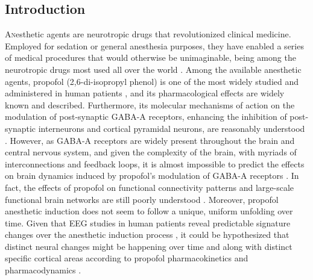 \documentclass[twoside]{article}
\begin{document}

\begin{multicols}{2} %


\section{Introduction}
\lettrine[nindent=0em,lines=3]{A}nesthetic agents are neurotropic drugs that revolutionized clinical medicine. Employed for sedation or general anesthesia purposes, they have enabled a series of medical procedures that would otherwise be unimaginable, being among the neurotropic drugs most used all over the world \citep{purdon2015clinical}. Among the available anesthetic agents, propofol (2,6-di-isopropyl phenol) is one of the most widely studied and administered in human patients \citep{purdon2015clinical}, and its pharmacological effects are widely known and described. Furthermore, its molecular mechanisms of action on the modulation of post-synaptic \mbox{GABA-A} receptors, enhancing the inhibition of post-synaptic interneurons and cortical pyramidal neurons, are reasonably understood \citep{bai1999general, hemmings2005emerging, purdon2015clinical}. 
However, as GABA-A receptors are widely present throughout the brain and central nervous system, and given the complexity of the brain, with myriads of interconnections and feedback loops, it is almost impossible to predict the effects on brain dynamics induced by propofol’s modulation of \mbox{GABA-A} receptors \citep{ching2014modeling}. In fact, the effects of propofol on functional connectivity patterns and large-scale functional brain networks are still poorly understood \citep{ishizawa2016dynamics}.
Moreover, propofol anesthetic induction does not seem to follow a unique, uniform unfolding over time. Given that EEG studies in human patients reveal predictable signature changes over the anesthetic induction process \citep{purdon2013electroencephalogram,purdon2015clinical}, it could be hypothesized that distinct neural changes might be happening over time and along with distinct specific cortical areas according to propofol pharmacokinetics and pharmacodynamics \citep{ishizawa2016dynamics}.




\end{multicols}
\end{document}
